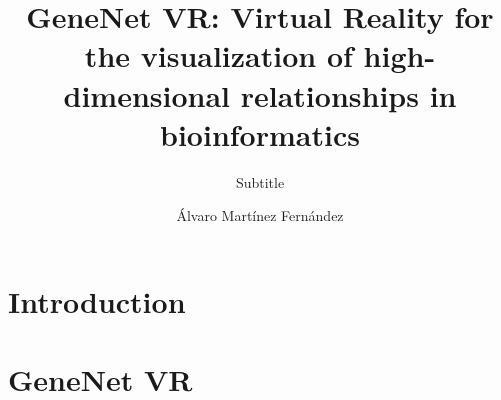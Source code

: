 \documentclass[USenglish]{uit-thesis}
\begin{document}

\title{GeneNet VR: Virtual Reality for the visualization of high-dimensional relationships in bioinformatics}
\subtitle{Subtitle}%
\author{\'Alvaro Mart\'inez Fern\'andez}

\pgfplotsset{width=\textwidth}

\maketitle

\frontmatter

\iffalse
\begin{dedication}
To...

Thanks for...
\end{dedication}


\begin{epigraph}
\epigraphitem{Simplicity is prerequisite for reliability.}{Edsger Dijkstra}
\epigraphitem{Beware of bugs in the above code;\\I have only proved it correct, not tried it.}{Donald Knuth}
\end{epigraph}

\begin{abstract}
This is the abstract, blah blah blah.
\end{abstract}

\begin{acknowledgement}
Thank you for blah blah blah
\end{acknowledgement}
\fi

\tableofcontents

\mainmatter

\chapter{Introduction}


\chapter{GeneNet VR}

\end{document}
